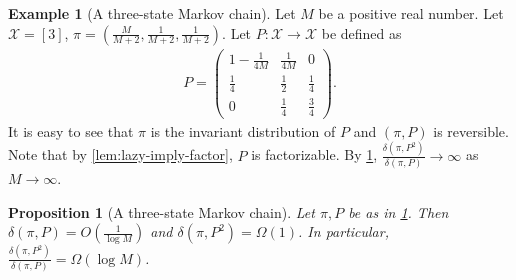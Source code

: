 \documentclass[11pt]{article}
\def\cX{\mathcal{X}}
\newtheorem{proposition}[theorem]{Proposition}
\theoremstyle{definition}
\newtheorem{example}[theorem]{Example}
\begin{document}
\begin{example}[A three-state Markov chain] \label{ex:three-state-alpha-vs-delta}
  Let $M$ be a positive real number.
  Let $\cX=[3]$, $\pi = \left( \frac M{M+2}, \frac 1{M+2}, \frac 1{M+2} \right)$.
  Let $P: \cX \to \cX$ be defined as
  \begin{align}
    P=\begin{pmatrix}
      1-\frac 1{4M} & \frac 1{4M} & 0 \\
      \frac 14 & \frac 12 & \frac 14 \\
      0 & \frac 14 & \frac 34
    \end{pmatrix}.
  \end{align}
  It is easy to see that $\pi$ is the invariant distribution of $P$ and $(\pi, P)$ is reversible.
  Note that by \cref{lem:lazy-imply-factor}, $P$ is factorizable.
  By \cref{prop:three-state-alpha-vs-delta}, $\frac{\delta\left(\pi, P^2\right)}{\delta(\pi, P)} \to \infty$ as $M\to \infty$.
\end{example}
\begin{proposition}[A three-state Markov chain] \label{prop:three-state-alpha-vs-delta}
  Let $\pi, P$ be as in \cref{ex:three-state-alpha-vs-delta}. Then $\delta(\pi, P) = O\left( \frac 1{\log M} \right)$ and $\delta\left(\pi, P^2\right) = \Omega(1)$.
  In particular, $\frac{\delta\left(\pi, P^2\right)}{\delta(\pi, P)} = \Omega(\log M)$.
\end{proposition}
\end{document}
